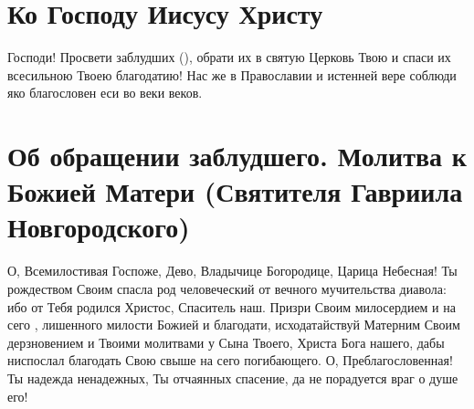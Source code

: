  

\section{Ко Господу Иисусу Христу}\begin{mymulticols}
 

Господи! Просвети заблудших (), обрати их в святую Церковь Твою и спаси их всесильною Твоею благодатию! Нас же в Православии и истенней вере соблюди яко благословен еси во веки веков.

\end{mymulticols}

\section{Об обращении заблудшего.  Молитва к Божией Матери  (Святителя Гавриила Новгородского)}\begin{mymulticols}


О, Всемилостивая Госпоже, Дево, Владычице Богородице, Царица Небесная! Ты рождеством Своим спасла род человеческий от вечного мучительства диавола: ибо от Тебя родился Христос, Спаситель наш. Призри Своим милосердием и на сего , лишенного милости Божией и благодати, исходатайствуй Матерним Своим дерзновением и Твоими молитвами у Сына Твоего, Христа Бога нашего, дабы ниспослал благодать Свою свыше на сего погибающего. О, Преблагословенная! Ты надежда ненадежных, Ты отчаянных спасение, да не порадуется враг о душе его! 

\end{mymulticols}

\mychapterending


 

